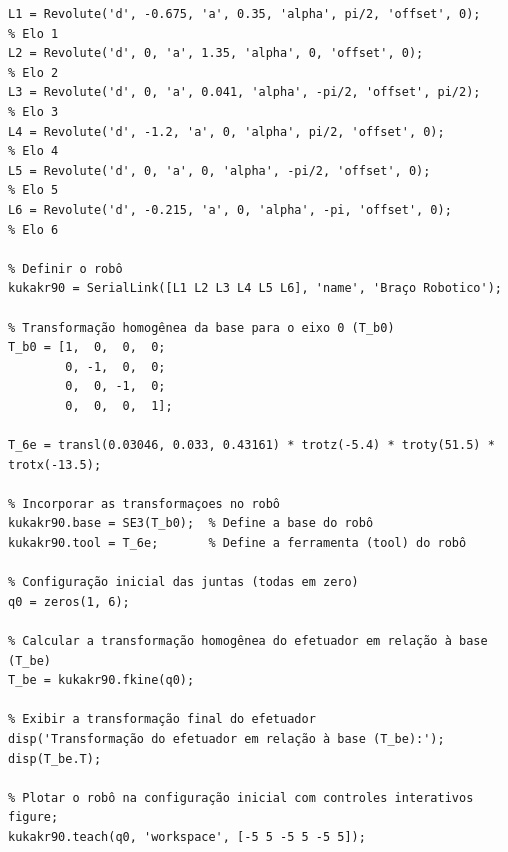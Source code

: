 \documentclass[10pt]{article}
\begin{document}
\begin{lstlisting}[caption={Código do braço robótico (KR90)}, label={code:kr90}]
% Parâmetros DH do robô
L1 = Revolute('d', -0.675, 'a', 0.35, 'alpha', pi/2, 'offset', 0);      % Elo 1
L2 = Revolute('d', 0, 'a', 1.35, 'alpha', 0, 'offset', 0);              % Elo 2
L3 = Revolute('d', 0, 'a', 0.041, 'alpha', -pi/2, 'offset', pi/2);      % Elo 3
L4 = Revolute('d', -1.2, 'a', 0, 'alpha', pi/2, 'offset', 0);           % Elo 4
L5 = Revolute('d', 0, 'a', 0, 'alpha', -pi/2, 'offset', 0);             % Elo 5
L6 = Revolute('d', -0.215, 'a', 0, 'alpha', -pi, 'offset', 0);          % Elo 6

% Definir o robô
kukakr90 = SerialLink([L1 L2 L3 L4 L5 L6], 'name', 'Braço Robotico');

% Transformação homogênea da base para o eixo 0 (T_b0)
T_b0 = [1,  0,  0,  0;
        0, -1,  0,  0;
        0,  0, -1,  0;
        0,  0,  0,  1];

T_6e = transl(0.03046, 0.033, 0.43161) * trotz(-5.4) * troty(51.5) * trotx(-13.5);

% Incorporar as transformaçoes no robô
kukakr90.base = SE3(T_b0);  % Define a base do robô
kukakr90.tool = T_6e;       % Define a ferramenta (tool) do robô

% Configuração inicial das juntas (todas em zero)
q0 = zeros(1, 6);

% Calcular a transformação homogênea do efetuador em relação à base (T_be)
T_be = kukakr90.fkine(q0);

% Exibir a transformação final do efetuador
disp('Transformação do efetuador em relação à base (T_be):');
disp(T_be.T);

% Plotar o robô na configuração inicial com controles interativos
figure;
kukakr90.teach(q0, 'workspace', [-5 5 -5 5 -5 5]);
\end{lstlisting}

\newpage
\end{document}
